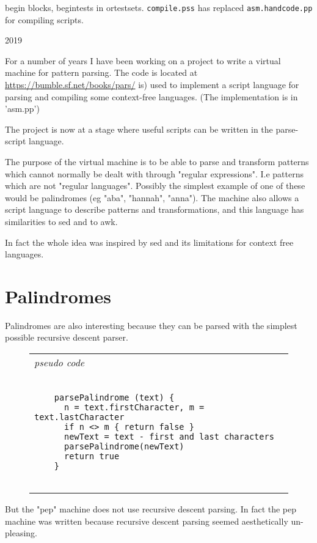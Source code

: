\documentclass[a4paper,12pt]{article}
\begin{document}
    begin blocks, begintests in ortestsets. \texttt{compile.pss}
    has replaced \texttt{asm.handcode.pp} for compiling scripts.

2019

  For a number of years I have been working on a project to write a virtual
  machine for pattern parsing. The code is located at
  \url{https://bumble.sf.net/books/pars/} is) used to implement a script language for
  parsing and compiling some context-free languages. (The implementation is in
  'asm.pp')

  The project is now at a stage where useful scripts can be written in
  the parse-script language.

  The purpose of the virtual machine is to be able to parse and transform
  patterns which cannot normally be dealt with through "regular expressions".
  I.e patterns which are not "regular languages". Possibly the simplest
  example of one of these would be palindromes (eg "aba", "hannah", "anna").
  The machine also allows a script language to describe patterns and
  transformations, and this language has similarities to sed and to awk.

  In fact the whole idea was inspired by sed and its limitations for
  context free languages.

\section{Palindromes}

 Palindromes are also interesting because they can be parsed with the
 simplest possible recursive descent parser.
 \begin{figure}
 \begin{tabular}{ l }
 \emph{ pseudo code } \\ 
 \begin{lstlisting}[breaklines] 

    parsePalindrome (text) {
      n = text.firstCharacter, m = text.lastCharacter
      if n <> m { return false }
      newText = text - first and last characters
      parsePalindrome(newText)
      return true
    }
  
 \end{lstlisting} 
 \end{tabular} 

 \end{figure}

 But the "pep" machine does not use recursive descent parsing. In fact
 the pep machine was written because recursive descent parsing seemed
 aesthetically un-pleasing.
\end{document}
